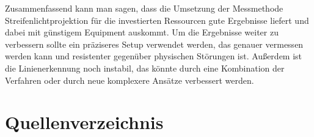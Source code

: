 \documentclass[ngerman,a4paper,parskip=half]{scrartcl}
\begin{document}
Zusammenfassend kann man sagen, dass die Umsetzung der Messmethode Streifenlichtprojektion für die investierten Ressourcen gute Ergebnisse liefert und dabei mit günstigem Equipment auskommt.
Um die Ergebnisse weiter zu verbessern sollte ein präziseres Setup verwendet werden, das genauer vermessen werden kann und resistenter gegenüber physischen Störungen ist. Außerdem ist die Linienerkennung noch instabil, das könnte durch eine Kombination der Verfahren oder durch neue komplexere Ansätze verbessert werden.


\section{Quellenverzeichnis}




\nocite{Haeming10sfm}
\nocite{Tomasi98stereomatching}
\nocite{manfred81math}
\nocite{opencv}
\nocite{particle}


\renewcommand{\section}[2]{}



\end{document}
